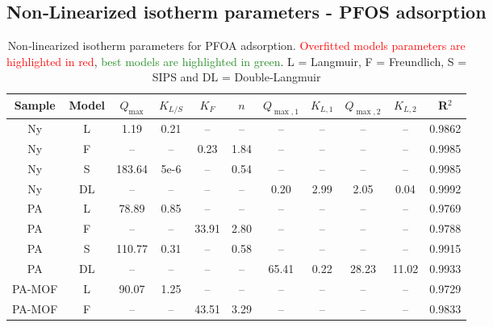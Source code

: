 \documentclass[journal=jacsat,manuscript=article]{achemso}
\begin{document}
\subsection{Non‑Linearized isotherm parameters - PFOS adsorption}
\begin{table}[H]
  \centering
	\caption{Non‑linearized isotherm parameters for PFOA adsorption.  \textcolor{red}{Overfitted models parameters are highlighted in red}, \textcolor{ForestGreen} {best models are highlighted in green}. L = Langmuir, F = Freundlich, S = SIPS and DL = Double‑Langmuir}
  \label{table:non-linearized_PFOS}
  \begin{tabular}{c | c | c c | c c | c c c c | c}
  	\hline
    Sample & Model              & $Q_{\max}$ & $K_{L/S}$   & $K_F$  & $n$   & $Q_{\max,1}$ & $K_{L,1}$  & $Q_{\max,2}$ & $K_{L,2}$  & R$^2$   \\
    \hline
    Ny     & L           &  1.19      & 0.21  & --     & --    & --           & --     & --           & --     & 0.9862  \\
    Ny     & F         & --         & --    & 0.23   & 1.84  & --           & --     & --           & --     & 0.9985  \\
    Ny     & S               &183.64      & 5e-6  & --     & 0.54  & --           & --     & --           & --     & 0.9985  \\
    \rowcolor{lime!25} Ny     & DL    & --         & --    & --     & --    & 0.20         & 2.99   & 2.05         & 0.04   & 0.9992  \\
    \hline
    PA   & L           & 78.89      & 0.85  & --     & --    & --           & --     & --           & --     & 0.9769  \\
    PA   & F         & --         & --    & 33.91  & 2.80  & --           & --     & --           & --     & 0.9788  \\
    PA   & S               &110.77      & 0.31  & --     & 0.58  & --           & --     & --           & --     & 0.9915  \\
    \rowcolor{lime!25} PA   & DL    & --         & --    & --     & --    & 65.41        & 0.22   & 28.23        & 11.02  & 0.9933  \\
    \hline
    PA-MOF  & L           & 90.07      & 1.25  & --     & --    & --           & --     & --           & --     & 0.9729  \\
    PA-MOF  & F         & --         & --    & 43.51  & 3.29  & --           & --     & --           & --     & 0.9833  \\

\end{tabular}
\end{table}
\end{document}
